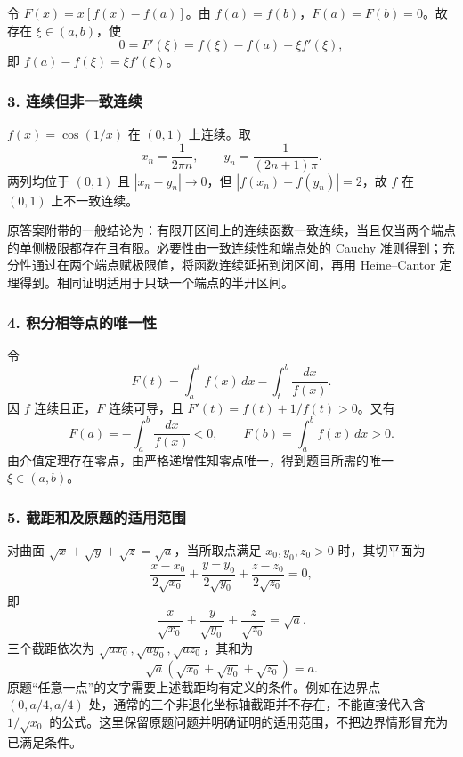 \documentclass[11pt,fontset=fandol]{ctexart}
\begin{document}
令 \(F(x)=x[f(x)-f(a)]\)。由 \(f(a)=f(b)\)，\(F(a)=F(b)=0\)。故存在
\(\xi\in(a,b)\)，使 \[
0=F'(\xi)=f(\xi)-f(a)+\xi f'(\xi),
\] 即 \(\boxed{f(a)-f(\xi)=\xi f'(\xi)}\)。

\subsubsection{3.
连续但非一致连续}\label{ux8fdeux7eedux4f46ux975eux4e00ux81f4ux8fdeux7eed}

\(f(x)=\cos(1/x)\) 在 \((0,1)\) 上连续。取 \[
x_n=\frac1{2\pi n},\qquad y_n=\frac1{(2n+1)\pi}.
\] 两列均位于 \((0,1)\) 且 \(|x_n-y_n|\to0\)，但
\(|f(x_n)-f(y_n)|=2\)，故 \(f\) 在 \((0,1)\) 上不一致连续。

原答案附带的一般结论为：有限开区间上的连续函数一致连续，当且仅当两个端点的单侧极限都存在且有限。必要性由一致连续性和端点处的
Cauchy
准则得到；充分性通过在两个端点赋极限值，将函数连续延拓到闭区间，再用
Heine--Cantor 定理得到。相同证明适用于只缺一个端点的半开区间。

\subsubsection{4.
积分相等点的唯一性}\label{ux79efux5206ux76f8ux7b49ux70b9ux7684ux552fux4e00ux6027}

令 \[
F(t)=\int_a^tf(x)\,dx-\int_t^b\frac{dx}{f(x)}.
\] 因 \(f\) 连续且正，\(F\) 连续可导，且 \(F'(t)=f(t)+1/f(t)>0\)。又有
\[
F(a)=-\int_a^b\frac{dx}{f(x)}<0,\qquad F(b)=\int_a^bf(x)\,dx>0.
\] 由介值定理存在零点，由严格递增性知零点唯一，得到题目所需的唯一
\(\xi\in(a,b)\)。

\subsubsection{5.
截距和及原题的适用范围}\label{ux622aux8dddux548cux53caux539fux9898ux7684ux9002ux7528ux8303ux56f4}

对曲面 \(\sqrt x+\sqrt y+\sqrt z=\sqrt a\)，当所取点满足
\(x_0,y_0,z_0>0\) 时，其切平面为 \[
\frac{x-x_0}{2\sqrt{x_0}}+\frac{y-y_0}{2\sqrt{y_0}}+\frac{z-z_0}{2\sqrt{z_0}}=0,
\] 即 \[
\frac{x}{\sqrt{x_0}}+\frac{y}{\sqrt{y_0}}+\frac{z}{\sqrt{z_0}}=\sqrt a.
\] 三个截距依次为 \(\sqrt{ax_0},\sqrt{ay_0},\sqrt{az_0}\)，其和为 \[
\boxed{\sqrt a(\sqrt{x_0}+\sqrt{y_0}+\sqrt{z_0})=a.}
\] 原题``任意一点''的文字需要上述截距均有定义的条件。例如在边界点
\((0,a/4,a/4)\) 处，通常的三个非退化坐标轴截距并不存在，不能直接代入含
\(1/\sqrt{x_0}\)
的公式。这里保留原题问题并明确证明的适用范围，不把边界情形冒充为已满足条件。
\end{document}
